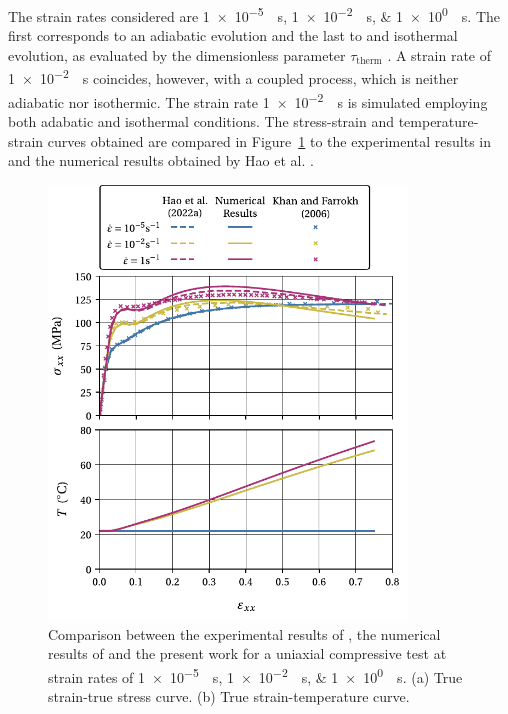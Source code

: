 The strain rates considered are \SIlist{1e-5;1e-2;1e0}{\per\second}.
The first corresponds to an adiabatic evolution and the last to and isothermal evolution, as evaluated by the dimensionless parameter $\tau_\text{therm}$ \citep{haoUnifiedAmorphousCrystalline2022}.
A strain rate of \SI{1e-2}{\per\second} coincides, however, with a coupled process, which is neither adiabatic nor isothermic.
The strain rate \SI{1e-2}{\per\second} is simulated employing both adabatic and isothermal conditions.
The stress-strain and temperature-strain curves obtained are compared in Figure~\ref{fig:stress_temp_strain_hao_results} to the experimental results in \cite{khanThermomechanicalResponseNylon2006} and the numerical results obtained by Hao et al. \citep{haoUnifiedAmorphousCrystalline2022}.
\begin{figure}[htbp]
  \centering
  \includegraphics[width=0.85\textwidth]{figures/stress_temp_strain_hao_results}
  \caption{Comparison between the experimental results of \cite{khanThermomechanicalResponseNylon2006}, the numerical results of \cite{haoUnifiedAmorphousCrystalline2022} and the present work for a uniaxial compressive test at strain rates of \SIlist{1e-5;1e-2;1e0}{\per\second}. (a) True strain-true stress curve. (b) True strain-temperature curve.}
\label{fig:stress_temp_strain_hao_results}
\end{figure}

